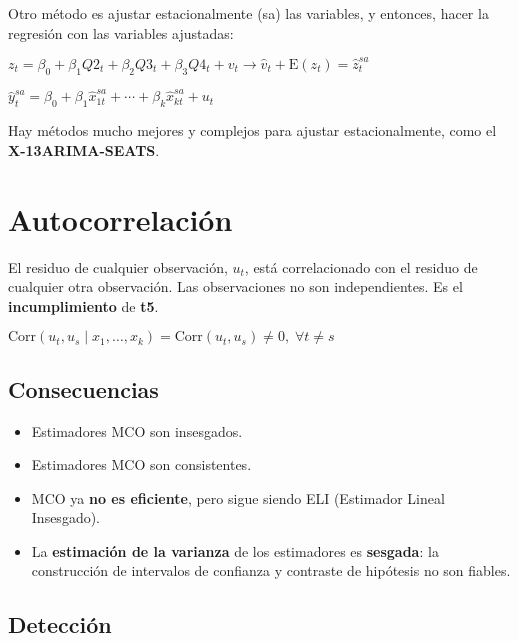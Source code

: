 \documentclass[10pt, a4paper, landscape]{extarticle}
\newcommand{\E}{\mathrm{E}}
\newcommand{\Corr}{\mathrm{Corr}}
\begin{document}
\begin{multicols}{3}
Otro método es ajustar estacionalmente (sa) las variables, y entonces, hacer la regresión con las variables ajustadas:

\begin{center}
	$z_t = \beta_0 + \beta_1 Q2_t + \beta_2 Q3_t + \beta_3 Q4_t  + v_t \rightarrow \hat{v}_t + \E(z_t) = \hat{z}_t^{sa}$

	$\hat{y}_t^{sa} = \beta_0 + \beta_1 \hat{x}_{1t}^{sa} + \cdots + \beta_k \hat{x}_{kt}^{sa} + u_t$
\end{center}

Hay métodos mucho mejores y complejos para ajustar estacionalmente, como el \textbf{X-13ARIMA-SEATS}.

\columnbreak

\section*{Autocorrelación}

El residuo de cualquier observación, $u_t$, está correlacionado con el residuo de cualquier otra observación. Las observaciones no son independientes. Es el \textbf{incumplimiento} de \textbf{t5}.

\begin{center}
	$\Corr(u_t, u_s \mid x_1, \ldots, x_k) = \Corr(u_t, u_s) \neq 0, \; \forall t \neq s$
\end{center}

\subsection*{Consecuencias}

\begin{itemize}[leftmargin=*]
	\item Estimadores MCO son insesgados.
	\item Estimadores MCO son consistentes.
	\item MCO ya \textbf{no es eficiente}, pero sigue siendo ELI (Estimador Lineal Insesgado).
	\item La \textbf{estimación de la varianza} de los estimadores es \textbf{sesgada}: la construcción de intervalos de confianza y contraste de hipótesis no son fiables.
\end{itemize}

\subsection*{Detección}


\end{multicols}
\end{document}
